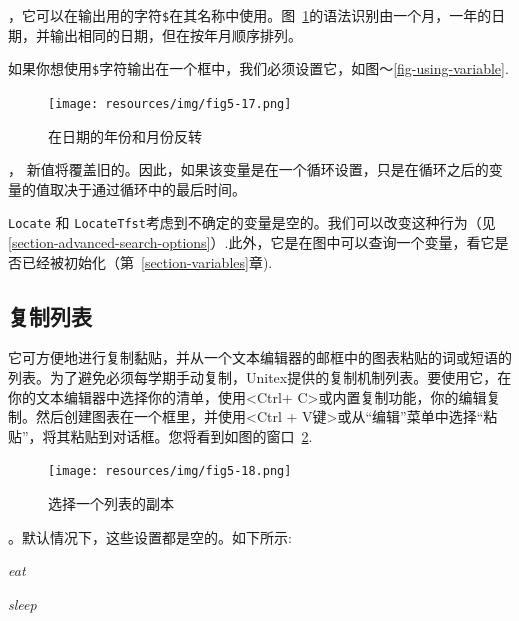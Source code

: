 \bigskip
{}，它可以在输出用的字符\verb+$+在其名称中使用。图~\ref{fig-date-grammar}的语法识别由一个月，一年的日期，并输出相同的日期，但在按年月顺序排列。

\bigskip
\noindent 如果你想使用\verb+$+字符输出在一个框中，我们必须设置它，如图〜\ref{fig-using-variable}.

\begin{figure}[h]
\begin{center}
\texttt{[image: resources/img/fig5-17.png]}
\caption{在日期的年份和月份反转\label{fig-date-grammar}}
\end{center}
\end{figure}

\bigskip
{}，
新值将覆盖旧的。因此，如果该变量是在一个循环设置，只是在循环之后的变量的值取决于通过循环中的最后时间。

\bigskip
{}\verb+Locate+ 和 \verb+LocateTfst+考虑到不确定的变量是空的。我们可以改变这种行为（见\ref{section-advanced-search-options}）.此外，它是在图中可以查询一个变量，看它是否已经被初始化（第~\ref{section-variables}章).

\subsection{复制列表}

它可方便地进行复制黏贴，并从一个文本编辑器的邮框中的图表粘贴的词或短语的列表。为了避免必须每学期手动复制，Unitex提供的复制机制列表。要使用它，在你的文本编辑器中选择你的清单，使用<Ctrl+ C>或内置复制功能，你的编辑复制。然后创建图表在一个框里，并使用<Ctrl + V键>或从“编辑”菜单中选择“粘贴”，将其粘贴到对话框。您将看到如图的窗口~\ref{fig-setting-contexts-for-multiple-copy}.

\begin{figure}[h]
\begin{center}
\texttt{[image: resources/img/fig5-18.png]}
\caption{选择一个列表的副本\label{fig-setting-contexts-for-multiple-copy}}
\end{center}
\end{figure}

\bigskip
{}。默认情况下，这些设置都是空的。如下所示:

\medskip
\textit{eat}

\textit{sleep}


